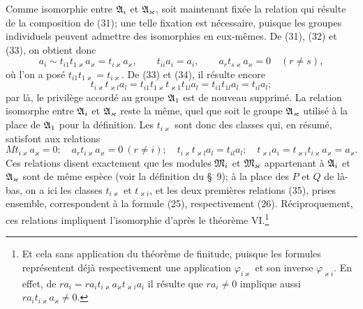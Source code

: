 Comme isomorphie entre $\mathfrak{A}_i$ et $\mathfrak{A}_\varkappa$, soit maintenant fixée la relation qui résulte de la composition de (31); une telle fixation est nécessaire, puisque les groupes individuels peuvent admettre des isomorphies en eux-mêmes. De (31), (32) et (33), on obtient donc
\begin{equation}
 a_i\sim t_{i1}t_{1\varkappa}a_\varkappa=t_{i\varkappa}a_\varkappa,
 \qquad
 t_{ii}a_i=a_i,
 \qquad
 a_rt_{s\varkappa}a_\varkappa=0\quad(r\ne s),
\tag{34}
\end{equation}
où l'on a posé $t_{i1}t_{1\varkappa}=t_{i\varkappa}$. De (33) et (34), il résulte encore
\[
 t_{i\varkappa}t_{\varkappa l}a_l=t_{i1}t_{1\varkappa}t_{\varkappa1}t_{1l}a_l
 =t_{i1}t_{1l}a_l=t_{il}a_l;
\]
par là, le privilège accordé au groupe $\mathfrak{A}_1$ est de nouveau supprimé. La relation isomorphe entre $\mathfrak{A}_i$ et $\mathfrak{A}_\varkappa$ reste la même, quel que soit le groupe $\mathfrak{A}_\varkappa$ utilisé à la place de $\mathfrak{A}_1$ pour la définition. Les $t_{i\varkappa}$ sont donc des classes qui, en résumé, satisfont aux relations
\begin{equation}
 Mt_{i\varkappa}a_\varkappa=0;
 \quad a_rt_{i\varkappa}a_\varkappa=0\ (r\ne i);
 \quad t_{i\varkappa}t_{\varkappa l}a_l=t_{il}a_l;
 \quad t_{\varkappa i}a_i=t_{\varkappa i}t_{i\varkappa}a_\varkappa=a_\varkappa.
\tag{35}
\end{equation}
Ces relations disent exactement que les modules $\mathfrak{M}_i$ et $\mathfrak{M}_\varkappa$ appartenant à $\mathfrak{A}_i$ et $\mathfrak{A}_\varkappa$ sont de même espèce (voir la définition du \S~9); à la place des $P$ et $Q$ de là-bas, on a ici les classes $t_{i\varkappa}$ et $t_{\varkappa i}$, et les deux premières relations (35), prises ensemble, correspondent à la formule (25), respectivement (26). Réciproquement, ces relations impliquent l'isomorphie d'après le théorème VI.\footnote{Et cela sans application du théorème de finitude, puisque les formules représentent déjà respectivement une application $\varphi_{i\varkappa}$ et son inverse $\varphi_{\varkappa i}$. En effet, de $ra_i=ra_it_{i\varkappa}a_\varkappa t_{\varkappa i}a_i$ il résulte que $ra_i\ne0$ implique aussi $ra_it_{i\varkappa}a_\varkappa\ne0$.}

